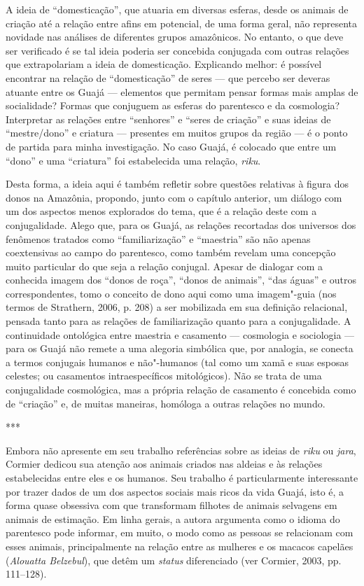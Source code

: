 A ideia de ``domesticação'', que atuaria em diversas esferas, desde os
animais de criação até a relação entre afins em potencial, de uma forma
geral, não representa novidade nas análises de diferentes grupos
amazônicos. No entanto, o que deve ser verificado é se tal ideia poderia
ser concebida conjugada com outras relações que extrapolariam a ideia de
domesticação. Explicando melhor: é possível encontrar na relação de
``domesticação'' de seres --- que percebo ser deveras atuante entre os Guajá
--- elementos que permitam pensar formas mais amplas de socialidade?
Formas que conjuguem as esferas do parentesco e da cosmologia?
Interpretar as relações entre ``senhores'' e ``seres de criação'' e suas
ideias de ``mestre/dono'' e criatura --- presentes em muitos grupos da
região --- é o ponto de partida para minha investigação. No caso Guajá, é
colocado que entre um ``dono'' e uma ``criatura'' foi estabelecida uma
relação, \emph{riku}.

Desta forma, a ideia aqui é também refletir sobre questões relativas à
figura dos donos na Amazônia, propondo, junto com o capítulo anterior,
um diálogo com um dos aspectos menos explorados do tema, que é a relação
deste com a conjugalidade. Alego que, para os Guajá, as relações
recortadas dos universos dos fenômenos tratados como ``familiarização'' e
``maestria'' são não apenas coextensivas ao campo do parentesco, como
também revelam uma concepção muito particular do que seja a relação
conjugal. Apesar de dialogar com a conhecida imagem dos ``donos de roça'',
``donos de animais'', ``das águas'' e outros correspondentes, tomo o
conceito de dono aqui como uma imagem"-guia (nos termos de Strathern,
2006, p. 208) a ser mobilizada em sua definição relacional, pensada tanto
para as relações de familiarização quanto para a conjugalidade. A
continuidade ontológica entre maestria e casamento --- cosmologia e
sociologia --- para os Guajá não remete a uma alegoria simbólica que, por
analogia, se conecta a termos conjugais humanos e não"-humanos (tal como
um xamã e suas esposas celestes; ou casamentos intraespecíficos
mitológicos). Não se trata de uma conjugalidade cosmológica, mas a
própria relação de casamento é concebida como de ``criação'' e, de muitas
maneiras, homóloga a outras relações no mundo.

\begin{center}
***
\end{center}

Embora não apresente em seu trabalho referências sobre as ideias de
\emph{riku} ou \emph{jara}, Cormier dedicou sua atenção aos animais
criados nas aldeias e às relações estabelecidas entre eles e os humanos.
Seu trabalho é particularmente interessante por trazer dados de um dos
aspectos sociais mais ricos da vida Guajá, isto é, a forma quase
obsessiva com que transformam filhotes de animais selvagens em animais
de estimação. Em linha gerais, a autora argumenta como o idioma do
parentesco pode informar, em muito, o modo como as pessoas se relacionam
com esses animais, principalmente na relação entre as mulheres e os
macacos capelães (\emph{Alouatta Belzebul}), que detêm um \emph{status}
diferenciado (ver Cormier, 2003, pp. 111--128).

